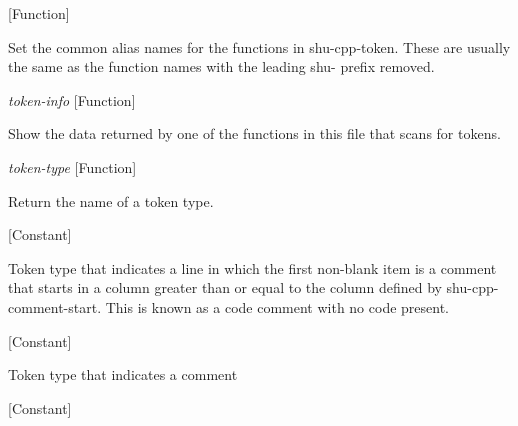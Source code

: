 \vspace{1em}
\noindent
{}
\usebox{\funcname}
 \hfill [Function]

\begin{doc-string}
Set the common alias names for the functions in shu-cpp-token.
These are usually the same as the function names with the leading
shu- prefix removed.
\end{doc-string}

\vspace{1em}
\noindent
{}
\usebox{\funcname}\emph{token-info}
 \hfill [Function]

\begin{doc-string}
Show the data returned by one of the functions in this file that scans for tokens.
\end{doc-string}

\vspace{1em}
\noindent
{}
\usebox{\funcname}\emph{token-type}
 \hfill [Function]

\begin{doc-string}
Return the name of a token type.
\end{doc-string}

\vspace{1em}
\noindent
{}
\usebox{\funcname}
 \hfill [Constant]

\begin{doc-string}
Token type that indicates a line in which the first non-blank item is a
comment that starts in a column greater than or equal to the column defined
by shu-cpp-comment-start.  This is known as a code comment with no code present.
\end{doc-string}

\vspace{1em}
\noindent
{}
\usebox{\funcname}
 \hfill [Constant]

\begin{doc-string}
Token type that indicates a comment
\end{doc-string}

\vspace{1em}
\noindent
{}
\usebox{\funcname}
 \hfill [Constant]

